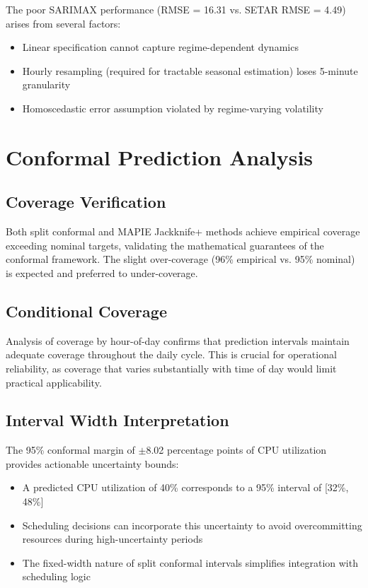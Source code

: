 \documentclass[12pt]{report}
\begin{document}
The poor SARIMAX performance (RMSE = 16.31 vs. SETAR RMSE = 4.49) arises from several factors:

\begin{itemize}
    \item Linear specification cannot capture regime-dependent dynamics
    \item Hourly resampling (required for tractable seasonal estimation) loses 5-minute granularity
    \item Homoscedastic error assumption violated by regime-varying volatility
\end{itemize}

\section{Conformal Prediction Analysis}

\subsection{Coverage Verification}

Both split conformal and MAPIE Jackknife+ methods achieve empirical coverage exceeding nominal targets, validating the mathematical guarantees of the conformal framework. The slight over-coverage (96\% empirical vs. 95\% nominal) is expected and preferred to under-coverage.

\subsection{Conditional Coverage}

Analysis of coverage by hour-of-day confirms that prediction intervals maintain adequate coverage throughout the daily cycle. This is crucial for operational reliability, as coverage that varies substantially with time of day would limit practical applicability.

\subsection{Interval Width Interpretation}

The 95\% conformal margin of $\pm$8.02 percentage points of CPU utilization provides actionable uncertainty bounds:

\begin{itemize}
    \item A predicted CPU utilization of 40\% corresponds to a 95\% interval of [32\%, 48\%]
    \item Scheduling decisions can incorporate this uncertainty to avoid overcommitting resources during high-uncertainty periods
    \item The fixed-width nature of split conformal intervals simplifies integration with scheduling logic
\end{itemize}
\end{document}
